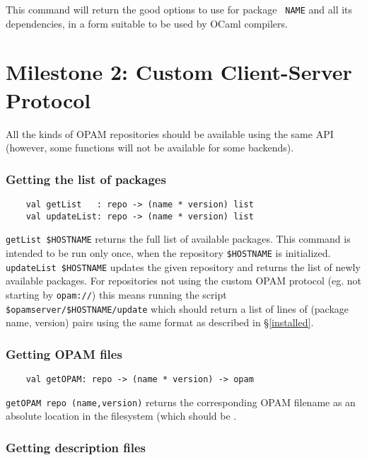 \documentclass[a4paper,11pt]{article}
\begin{document}
This command will return the good options to use for package {\tt
  NAME} and all its dependencies, in a form suitable to be used by
OCaml compilers.

\section{Milestone 2: Custom Client-Server Protocol}
\label{api}

All the kinds of OPAM repositories should be available using the same
API (however, some functions will not be available for some backends).

\subsubsection{Getting the list of packages}

\label{getList}
\begin{verbatim}
    val getList   : repo -> (name * version) list 
    val updateList: repo -> (name * version) list
\end{verbatim}

\verb+getList $HOSTNAME+ returns the full list of available packages. This
command is intended to be run only once, when the repository
\verb+$HOSTNAME+ is initialized.\\

\verb+updateList $HOSTNAME+ updates the given repository and returns
the list of newly available packages. For repositories not using the
custom OPAM protocol (eg. not starting by \verb+opam://+) this means
running the script \verb+$opamserver/$HOSTNAME/update+ which should
return a list of lines of (package name, version) pairs using the same
format as described in \S\ref{installed}.

\subsubsection{Getting OPAM files}
\label{getOPAM}

\begin{verbatim}
    val getOPAM: repo -> (name * version) -> opam
\end{verbatim}

{\tt getOPAM repo (name,version)} returns the corresponding OPAM
filename as an absolute location in the filesystem (which should be .

\subsubsection{Getting description files}
\label{getOPAM}
\end{document}
